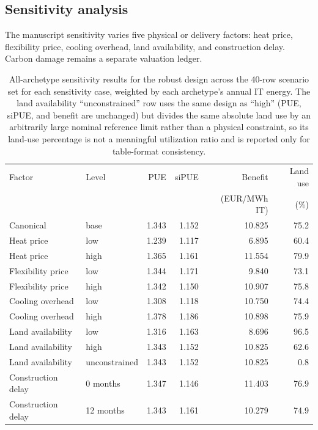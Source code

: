 \documentclass[preprint,12pt]{elsarticle}
\begin{document}
\subsection{Sensitivity analysis}

The manuscript sensitivity varies five physical or delivery factors: heat price, flexibility price, cooling overhead, land availability, and construction delay. Carbon damage remains a separate valuation ledger.

\begin{table}[H]
\centering
\small
\caption{All-archetype sensitivity results for the robust design across the 40-row scenario set for each sensitivity case, weighted by each archetype's annual IT energy. The land availability ``unconstrained'' row uses the same design as ``high'' (PUE, siPUE, and benefit are unchanged) but divides the same absolute land use by an arbitrarily large nominal reference limit rather than a physical constraint, so its land-use percentage is not a meaningful utilization ratio and is reported only for table-format consistency.}
\label{tab:sensitivity-summary}
\begin{tabularx}{\linewidth}{L{2.5cm} L{2.25cm} r r r r}
\toprule
Factor & Level & PUE & siPUE & Benefit & Land use \\
 & & & & (EUR/MWh IT) & (\%) \\
\midrule
Canonical & base & 1.343 & 1.152 & 10.825 & 75.2 \\
Heat price & low & 1.239 & 1.117 & 6.895 & 60.4 \\
Heat price & high & 1.365 & 1.161 & 11.554 & 79.9 \\
Flexibility price & low & 1.344 & 1.171 & 9.840 & 73.1 \\
Flexibility price & high & 1.342 & 1.150 & 10.907 & 75.8 \\
Cooling overhead & low & 1.308 & 1.118 & 10.750 & 74.4 \\
Cooling overhead & high & 1.378 & 1.186 & 10.898 & 75.9 \\
Land availability & low & 1.316 & 1.163 & 8.696 & 96.5 \\
Land availability & high & 1.343 & 1.152 & 10.825 & 62.6 \\
Land availability & unconstrained & 1.343 & 1.152 & 10.825 & 0.8 \\
Construction delay & 0 months & 1.347 & 1.146 & 11.403 & 76.9 \\
Construction delay & 12 months & 1.343 & 1.161 & 10.279 & 74.9 \\
\bottomrule
\end{tabularx}
\end{table}
\end{document}

